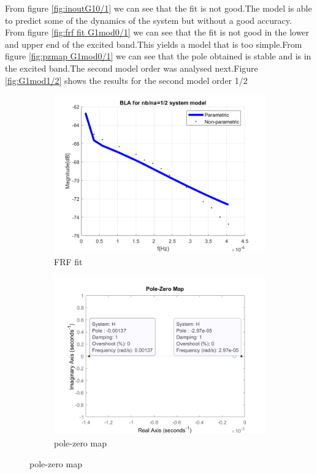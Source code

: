 \documentclass[a4paper,12pt]{report}
\numberwithin{equation}{section}
\begin{document}
\noindent
From figure \ref{fig:inoutG10/1} we can see that the fit is not good.The model is able to predict some of the dynamics of the system but without a good accuracy. From figure \ref{fig:frf fit G1mod0/1} we can see that the fit is not good in the lower and upper end of the excited band.This yields a model that is too simple.From figure \ref{fig:pzmap G1mod0/1} we can see that the pole obtained is stable and is in the excited band.The second model order was analysed next.Figure \ref{fig:G1mod1/2} shows the results for the second model order 1/2 

\begin{figure}[H]
\centering
\begin{subfigure}{\textwidth}
  \centering
  \includegraphics[width=.6\linewidth]{G1mod12FrfFit.png}
  \caption{FRF fit}
  \label{fig:frf fit G1mod1/2}
\end{subfigure}

 \begin{subfigure}{\textwidth}
  \centering
  \includegraphics[width=.6\linewidth]{G1mod12pzmap.png}
  \caption{pole-zero map}
  \label{fig:pzmap G1mod1/2}
\end{subfigure}
\end{figure}
\clearpage
\end{document}
